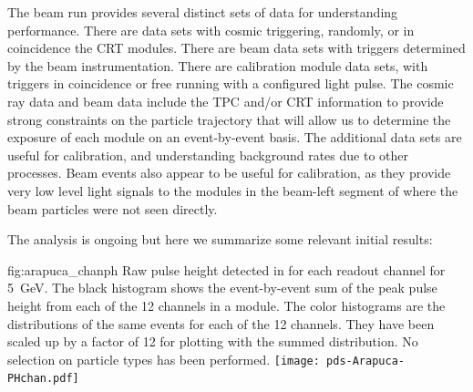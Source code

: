 The  beam run provides several distinct sets of data for understanding  performance.  
There are data sets with cosmic triggering, randomly, or in coincidence the CRT modules.
There are beam data sets with triggers determined by the beam instrumentation.
There are calibration module data sets, with triggers in coincidence or free running with a configured light pulse. The cosmic ray data and beam data include the TPC and/or CRT information to provide strong constraints on the particle trajectory that will allow us to determine the exposure of each module on an event-by-event basis.  The additional data sets are useful for calibration, and understanding background rates due to other processes.  Beam events also appear to be useful for calibration, as they provide very low level light signals to the modules in the beam-left segment of  where the beam particles were not seen directly.

The analysis is ongoing but here we summarize some relevant initial results:


\begin{dunefigure}{fig:arapuca_chanph}
{Raw pulse height detected in  for each readout channel for \SI{5}{GeV}. The black histogram shows the event-by-event sum of the peak pulse height  from each of the \num{12}  channels in a module. The color histograms are the distributions of the same events for each of the \num{12} channels.  They have been scaled up by a factor of \num{12} for plotting with the summed distribution. No selection on particle types has been performed.}
\texttt{[image: pds-Arapuca-PHchan.pdf]}
\end{dunefigure}

